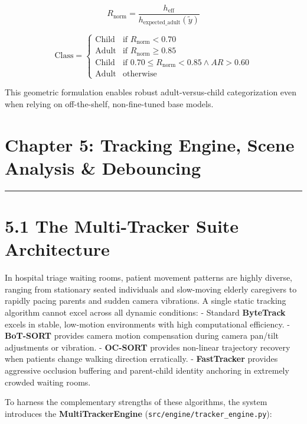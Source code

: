 \[R_{\text{norm}} = \frac{h_{\text{eff}}}{h_{\text{expected\_adult}}(\tilde{y})}\]

\[\text{Class} = \begin{cases} \text{Child} & \text{if } R_{\text{norm}} < 0.70 \\ \text{Adult} & \text{if } R_{\text{norm}} \ge 0.85 \\ \text{Child} & \text{if } 0.70 \le R_{\text{norm}} < 0.85 \land AR > 0.60 \\ \text{Adult} & \text{otherwise} \end{cases}\]

This geometric formulation enables robust adult-versus-child
categorization even when relying on off-the-shelf, non-fine-tuned base
models.

\section{Chapter 5: Tracking Engine, Scene Analysis \&
Debouncing}\label{chapter-5-tracking-engine-scene-analysis-debouncing}

\begin{center}\rule{0.5\linewidth}{0.5pt}\end{center}

\section{5.1 The Multi-Tracker Suite
Architecture}\label{the-multi-tracker-suite-architecture}

In hospital triage waiting rooms, patient movement patterns are highly
diverse, ranging from stationary seated individuals and slow-moving
elderly caregivers to rapidly pacing parents and sudden camera
vibrations. A single static tracking algorithm cannot excel across all
dynamic conditions: - Standard \textbf{ByteTrack} excels in stable,
low-motion environments with high computational efficiency. -
\textbf{BoT-SORT} provides camera motion compensation during camera
pan/tilt adjustments or vibration. - \textbf{OC-SORT} provides
non-linear trajectory recovery when patients change walking direction
erratically. - \textbf{FastTracker} provides aggressive occlusion
buffering and parent-child identity anchoring in extremely crowded
waiting rooms.

To harness the complementary strengths of these algorithms, the system
introduces the \textbf{MultiTrackerEngine}
(\texttt{src/engine/tracker\_engine.py}):


